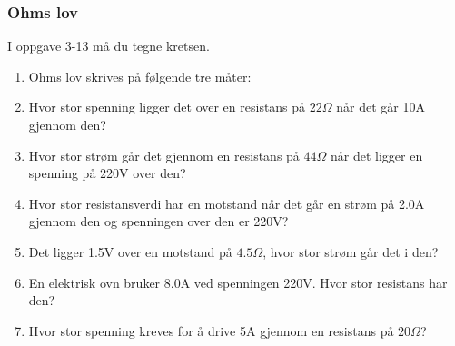 \documentclass[12pt,a4paper]{article}
\begin{document}
\subsubsection{Ohms lov}

I oppgave 3-13 må du tegne kretsen. 
\begin{enumerate}
\item Ohms lov skrives på følgende tre måter:
\vskip 5pt 
\vskip 2.5pt 
\item Hvor stor spenning ligger det over en resistans på $22\Omega$ når det går 10A gjennom den?
\vskip 5pt 
\vskip 2.5pt 
\item Hvor stor strøm går det gjennom en resistans på $44\Omega$ når det ligger en spenning på 220V over den?
\vskip 5pt 
\vskip 2.5pt 
\item Hvor stor resistansverdi har en motstand når det går en strøm på 2.0A gjennom den og spenningen over den er 220V?
\vskip 5pt 
\vskip 2.5pt 
\item Det ligger 1.5V over en motstand på $4.5\Omega$, hvor stor strøm går det i den?
\vskip 5pt 
\vskip 2.5pt 
\item En elektrisk ovn bruker 8.0A ved spenningen 220V. Hvor stor resistans har den?
\vskip 5pt 
\vskip 2.5pt 
\item Hvor stor spenning kreves for å drive 5A gjennom en resistans på $20\Omega$? 
\vskip 5pt 
\vskip 2.5pt 

\end{enumerate}
\end{document}
